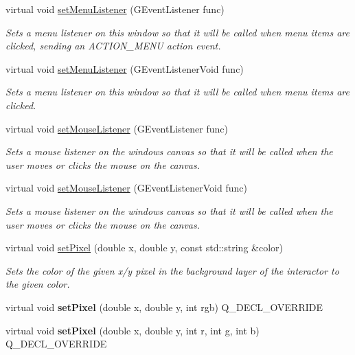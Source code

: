 \begin{DoxyCompactItemize}
virtual void \mbox{\hyperlink{classGWindow_ab0002e0bf6566a5b98cc9128cb859b0e}{set\+Menu\+Listener}} (G\+Event\+Listener func)
\begin{DoxyCompactList}\small\item\em Sets a menu listener on this window so that it will be called when menu items are clicked, sending an A\+C\+T\+I\+O\+N\+\_\+\+M\+E\+NU action event. \end{DoxyCompactList}\item 
virtual void \mbox{\hyperlink{classGWindow_a1294d48e67c30207da71c3e3ab56abde}{set\+Menu\+Listener}} (G\+Event\+Listener\+Void func)
\begin{DoxyCompactList}\small\item\em Sets a menu listener on this window so that it will be called when menu items are clicked. \end{DoxyCompactList}\item 
virtual void \mbox{\hyperlink{classGWindow_a37d8dbc943f59920f705b0104f60bde2}{set\+Mouse\+Listener}} (G\+Event\+Listener func)
\begin{DoxyCompactList}\small\item\em Sets a mouse listener on the window\textquotesingle{}s canvas so that it will be called when the user moves or clicks the mouse on the canvas. \end{DoxyCompactList}\item 
virtual void \mbox{\hyperlink{classGWindow_aea7f647ea62d59f71b5fad6aa65eeaf9}{set\+Mouse\+Listener}} (G\+Event\+Listener\+Void func)
\begin{DoxyCompactList}\small\item\em Sets a mouse listener on the window\textquotesingle{}s canvas so that it will be called when the user moves or clicks the mouse on the canvas. \end{DoxyCompactList}\item 
virtual void \mbox{\hyperlink{classGDrawingSurface_a09f9640e4ff7388dcfc391efd88d2415}{set\+Pixel}} (double x, double y, const std\+::string \&color)
\begin{DoxyCompactList}\small\item\em Sets the color of the given x/y pixel in the background layer of the interactor to the given color. \end{DoxyCompactList}\item 
virtual void {\bfseries set\+Pixel} (double x, double y, int rgb) Q\+\_\+\+D\+E\+C\+L\+\_\+\+O\+V\+E\+R\+R\+I\+DE
\item 
virtual void {\bfseries set\+Pixel} (double x, double y, int r, int g, int b) Q\+\_\+\+D\+E\+C\+L\+\_\+\+O\+V\+E\+R\+R\+I\+DE

\end{DoxyCompactItemize}
